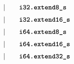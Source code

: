 \begin{alignat*}{9}
    &&       &&\quad | &\quad && \textbf{\texttt{i32.extend8\textunderscore s}} \quad &&  \\[1mm]
    &&       &&\quad | &\quad && \textbf{\texttt{i32.extend16\textunderscore s}} \quad &&  \\[1mm]
    &&       &&\quad | &\quad && \textbf{\texttt{i64.extend8\textunderscore s}} \quad &&  \\[1mm]
    &&       &&\quad | &\quad && \textbf{\texttt{i64.extend16\textunderscore s}} \quad &&  \\[1mm]
    &&       &&\quad | &\quad && \textbf{\texttt{i64.extend32\textunderscore s}} \quad &&  \\[1mm]
\end{alignat*}
